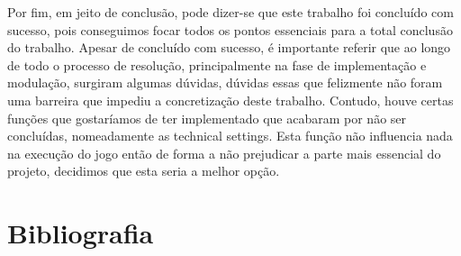 \documentclass[a4paper,11pt]{article}
\newcommand\tab[1][0.8cm]{\hspace*{#1}}
\begin{document}
Por fim, em jeito de conclusão, pode dizer-se que este trabalho foi concluído com sucesso, pois conseguimos focar todos os pontos essenciais para a total conclusão do trabalho. Apesar de concluído com sucesso, é importante referir que ao longo de todo o processo de resolução, principalmente na fase de implementação e modulação, surgiram algumas dúvidas, dúvidas essas que felizmente não foram uma barreira que impediu a concretização deste trabalho. Contudo, houve certas funções que gostaríamos de ter implementado que acabaram por não ser concluídas, nomeadamente as technical settings. Esta função não influencia nada na execução do jogo então de forma a não prejudicar a parte mais essencial do projeto, decidimos que esta seria a melhor opção.



\pagebreak






\printbibliography[title={Referências Bibliográficas}]


\pagebreak





\appendix

\section{Bibliografia}

\tab \Blindtext

\pagebreak
\end{document}

